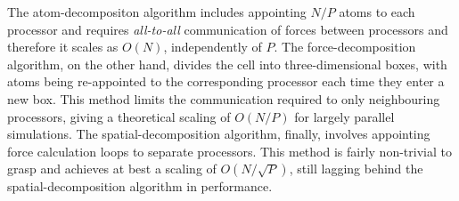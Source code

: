 The atom-decompositon algorithm includes appointing $N/P$ atoms to each processor and requires \textit{all-to-all} communication of forces between processors and therefore it scales as $O(N)$, independently of $P$. 
The force-decomposition algorithm, on the other hand, divides the cell into three-dimensional boxes, with atoms being re-appointed to the corresponding processor each time they enter a new box. 
This method limits the communication required to only neighbouring processors, giving a theoretical scaling of $O(N/P)$ for largely parallel simulations.
The spatial-decomposition algorithm, finally, involves appointing force calculation loops to separate processors.
This method is fairly non-trivial to grasp and achieves at best a scaling of $O(N/\sqrt{P})$, still lagging behind the spatial-decomposition algorithm in performance. \cite{fincham1987parallel,lammpsMD}



